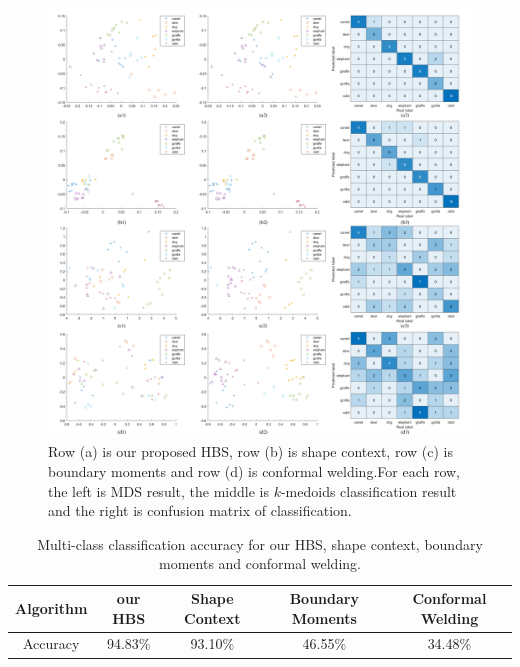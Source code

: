 \documentclass[review,onefignum,onetabnum]{siamonline190516}
\begin{document}
        \begin{figure}
            \begin{center}
                \includegraphics[width=\textwidth]{mds_km.png}
            \end{center}
            \caption{Row (a) is our proposed HBS, row (b) is shape context, row (c) is boundary moments and row (d) is conformal welding.For each row, the left is MDS result, the middle is $k$-medoids classification result and the right is confusion matrix of classification.}
            \label{mds2}
        \end{figure}

        \begin{table}[]
        \centering
        \begin{tabular}{|c|c|c|c|c|}
        \hline
        Algorithm & our HBS & Shape Context & Boundary Moments & Conformal Welding \\ \hline
        Accuracy  & 94.83\% & 93.10\% & 46.55\% & 34.48\% \\ \hline
        \end{tabular}
        \caption{Multi-class classification accuracy for our HBS, shape context, boundary moments and conformal welding.}
        \label{acc table}
        \end{table}
        
\end{document}
